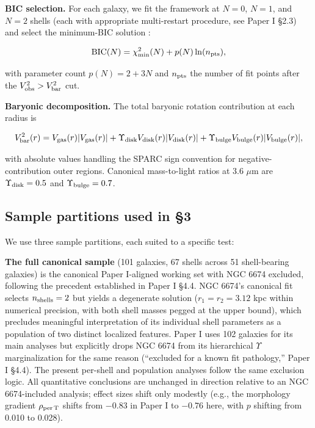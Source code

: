 \documentclass[linenumbers,trackchanges]{aastex701}
\begin{document}
\textbf{BIC selection.} For each galaxy, we fit the framework at $N = 0$, $N = 1$, and $N = 2$ shells (each with appropriate multi-restart procedure, see Paper I \S2.3) and select the minimum-BIC solution \citep{Schwarz1978}:

\begin{equation}
\mathrm{BIC}(N) = \chi^2_{\min}(N) + p(N) \ln(n_{\rm pts}),
\end{equation}

with parameter count $p(N) = 2 + 3N$ and $n_{\rm pts}$ the number of fit points after the $V_{\rm obs}^2 > V_{\rm bar}^2$ cut.

\textbf{Baryonic decomposition.} The total baryonic rotation contribution at each radius is

\begin{equation}
V_{\rm bar}^2(r) = V_{\rm gas}(r) |V_{\rm gas}(r)| + \Upsilon_{\rm disk} V_{\rm disk}(r) |V_{\rm disk}(r)| + \Upsilon_{\rm bulge} V_{\rm bulge}(r) |V_{\rm bulge}(r)|,
\end{equation}

with absolute values handling the SPARC sign convention for negative-contribution outer regions. Canonical mass-to-light ratios at 3.6 $\mu$m are $\Upsilon_{\rm disk} = 0.5$ and $\Upsilon_{\rm bulge} = 0.7$.

\subsection{Sample partitions used in \S3}

We use three sample partitions, each suited to a specific test:

\textbf{The full canonical sample} (101 galaxies, 67 shells across 51 shell-bearing galaxies) is the canonical Paper I-aligned working set with NGC 6674 excluded, following the precedent established in Paper I \S4.4. NGC 6674's canonical fit selects $n_{\rm shells} = 2$ but yields a degenerate solution ($r_1 = r_2 = 3.12$ kpc within numerical precision, with both shell masses pegged at the upper bound), which precludes meaningful interpretation of its individual shell parameters as a population of two distinct localized features. Paper I uses 102 galaxies for its main analyses but explicitly drops NGC 6674 from its hierarchical $\Upsilon$ marginalization for the same reason (``excluded for a known fit pathology,'' Paper I \S4.4). The present per-shell and population analyses follow the same exclusion logic. All quantitative conclusions are unchanged in direction relative to an NGC 6674-included analysis; effect sizes shift only modestly (e.g., the morphology gradient $\rho_{\rm per\,T}$ shifts from $-0.83$ in Paper I to $-0.76$ here, with $p$ shifting from 0.010 to 0.028).
\end{document}

